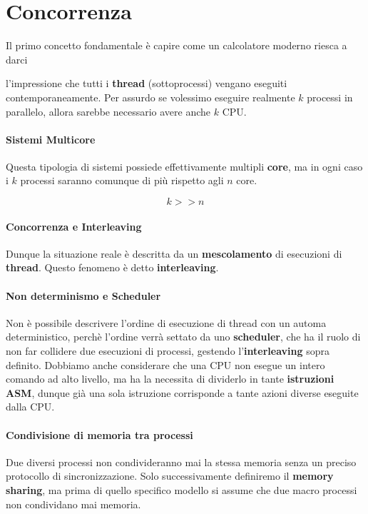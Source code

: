 \documentclass{article}
\begin{document}
\section{Concorrenza}

Il primo concetto fondamentale è capire come un calcolatore moderno riesca a darci 

l'impressione che tutti i \textbf{thread} (sottoprocessi) vengano eseguiti contemporaneamente. Per assurdo se volessimo eseguire realmente $k$ processi in parallelo, allora sarebbe necessario avere anche $k$ CPU. 


\paragraph{Sistemi Multicore} Questa tipologia di sistemi possiede effettivamente multipli \textbf{core}, ma in ogni caso i $k$ processi saranno comunque di più rispetto agli $n$ core.

\[ k >> n \]

\paragraph{Concorrenza e Interleaving} Dunque la situazione reale è descritta da un \textbf{mescolamento} di esecuzioni di \textbf{thread}. Questo fenomeno è detto \textbf{interleaving}.

\paragraph{Non determinismo e Scheduler} Non è possibile descrivere l'ordine di esecuzione di thread con un automa deterministico, perchè l'ordine verrà settato da uno \textbf{scheduler}, che ha il ruolo di non far collidere due esecuzioni di processi, gestendo l'\textbf{interleaving} sopra definito. Dobbiamo anche considerare che una CPU non esegue un intero comando ad alto livello, ma ha la necessita di dividerlo in tante \textbf{istruzioni ASM}, dunque già una sola istruzione corrisponde a tante azioni diverse eseguite dalla CPU.

\paragraph{Condivisione di memoria tra processi} Due diversi processi non condivideranno mai la stessa memoria senza un preciso protocollo di sincronizzazione. Solo successivamente definiremo il \textbf{memory sharing}, ma prima di quello specifico modello si assume che due macro processi non condividano mai memoria.
\end{document}
